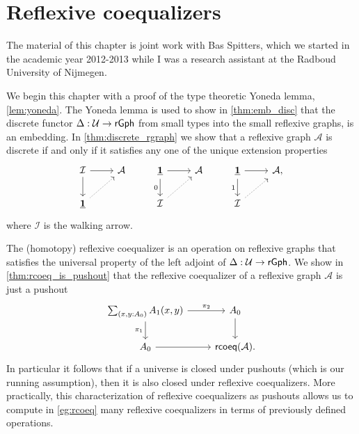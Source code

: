 \chapter{Reflexive coequalizers}

The material of this chapter is joint work with Bas Spitters, which we started in the academic year 2012-2013 while I was a research assistant at the Radboud University of Nijmegen.

We begin this chapter with a proof of the type theoretic Yoneda lemma, \cref{lem:yoneda}. The Yoneda lemma is used to show in \cref{thm:emb_disc} that the discrete functor $\Delta:\mathcal{U}\to\mathsf{rGph}$ from small types into the small reflexive graphs, is an embedding. In \cref{thm:discrete_rgraph} we show that a reflexive graph $\mathcal{A}$ is discrete if and only if it satisfies any one of the unique extension properties
\begin{equation*}
\begin{tikzcd}
\mathcal{I} \arrow[r] \arrow[d] & \mathcal{A} & \unit \arrow[d,swap,"0"] \arrow[r] & \mathcal{A} & \unit \arrow[d,swap,"1"] \arrow[r] & \mathcal{A}, \\
\unit \arrow[ur,densely dotted] & & \mathcal{I} \arrow[ur,densely dotted] & & \mathcal{I} \arrow[ur,densely dotted]
\end{tikzcd}
\end{equation*}
where $\mathcal{I}$ is the walking arrow. 

The (homotopy) reflexive coequalizer is an operation on reflexive graphs that satisfies the universal property of the left adjoint of $\Delta:\mathcal{U}\to\mathsf{rGph}$. We show in \cref{thm:rcoeq_is_pushout} that the reflexive coequalizer of a reflexive graph $\mathcal{A}$ is just a pushout
\begin{equation*}
\begin{tikzcd}
\sm{x,y:\pts{A}}\edg{A}(x,y) \arrow[r,"\pi_2"] \arrow[d,swap,"\pi_1"] & \pts{A} \arrow[d] \\
\pts{A} \arrow[r] & \mathsf{rcoeq}(\mathcal{A}).
\end{tikzcd}
\end{equation*}
In particular it follows that if a universe is closed under pushouts (which is our running assumption), then it is also closed under reflexive coequalizers. More practically, this characterization of reflexive coequalizers as pushouts allows us to compute in \cref{eg:rcoeq} many reflexive coequalizers in terms of previously defined operations.


